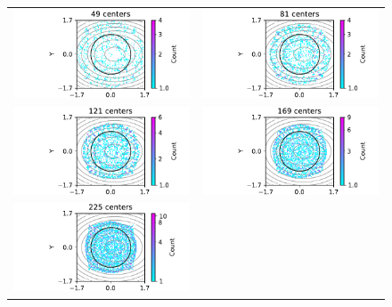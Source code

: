 \documentclass[12pt]{report} %
\begin{document}
\begin{figure}
  \hspace*{-2cm}
  \begin{tabular}{cc}
    \includegraphics[width=.6\textwidth]{imagenes/experiments/2d/statistical_2d_full_scheduler_interpolation/runge_2d/circle_c49_runge_2d_gaussian_kernel.pdf}  &
    \includegraphics[width=.6\textwidth]{imagenes/experiments/2d/statistical_2d_full_scheduler_interpolation/runge_2d/circle_c81_runge_2d_gaussian_kernel.pdf}    \\
    \includegraphics[width=.6\textwidth]{imagenes/experiments/2d/statistical_2d_full_scheduler_interpolation/runge_2d/circle_c121_runge_2d_gaussian_kernel.pdf} &
    \includegraphics[width=.6\textwidth]{imagenes/experiments/2d/statistical_2d_full_scheduler_interpolation/runge_2d/circle_c169_runge_2d_gaussian_kernel.pdf}   \\
    \includegraphics[width=.6\textwidth]{imagenes/experiments/2d/statistical_2d_full_scheduler_interpolation/runge_2d/circle_c225_runge_2d_gaussian_kernel.pdf}

\end{tabular}
\end{figure}
\end{document}
